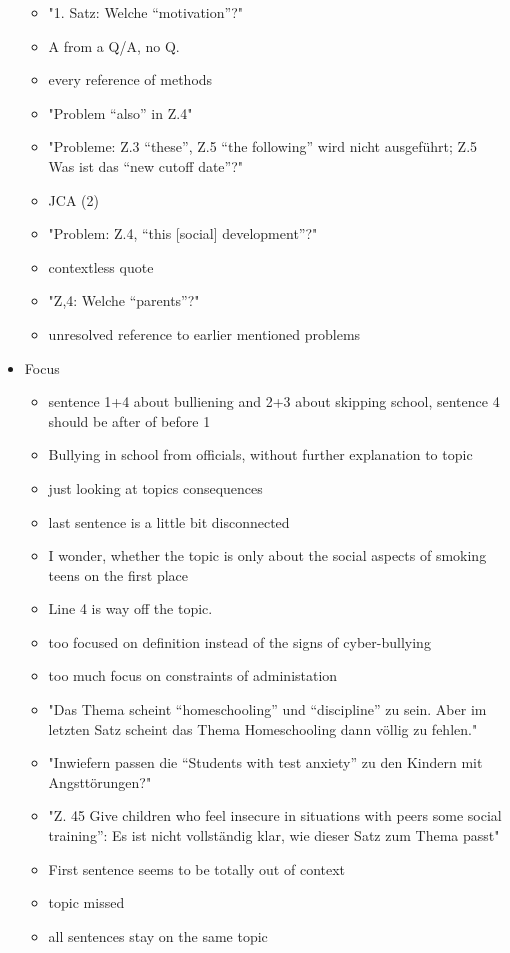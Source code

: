 \begin{itemize}[topsep = 0pt, itemsep = 0pt]
\begin{itemize}[topsep = 0pt, itemsep = 0pt]
		\item "1. Satz: Welche “motivation”?"
		\item A from a Q/A, no Q.
		\item every reference of methods
		\item "Problem “also” in Z.4"
		\item "Probleme: Z.3 “these”, Z.5 “the following” wird nicht ausgeführt; Z.5 Was ist das “new cutoff date”?"
		\item JCA (2)
		\item "Problem: Z.4, “this [social] development”?"
		\item contextless quote
		\item "Z,4: Welche “parents”?"
		\item unresolved reference to earlier mentioned problems
	\end{itemize}
	\item Focus
	\begin{itemize}[topsep = 0pt, itemsep = 0pt]
		\item sentence 1+4 about bulliening and 2+3 about skipping school, sentence 4 should be after of before 1
		\item Bullying in school from officials, without further explanation to topic
		\item just looking at topics consequences
		\item last sentence is a little bit disconnected
		\item I wonder, whether the topic is only about the social aspects of smoking teens on the first place
		\item Line 4 is way off the topic.
		\item too focused on definition instead of the signs of cyber-bullying
		\item too much focus on constraints of administation
		\item "Das Thema scheint “homeschooling” und “discipline” zu sein. Aber im letzten Satz scheint das Thema Homeschooling dann völlig zu fehlen."
		\item "Inwiefern passen die “Students with test anxiety” zu den Kindern mit Angsttörungen?"
		\item "Z. 45 Give children who feel insecure in situations with peers some social training”: Es ist nicht vollständig klar, wie dieser Satz zum Thema passt"
		\item First sentence seems to be totally out of context
		\item topic missed
		\item all sentences stay on the same topic

\end{itemize}
\end{itemize}
